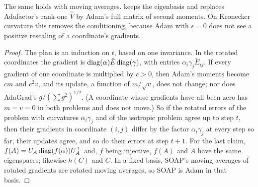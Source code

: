 \begin{refsection}
The same holds with moving averages.  keeps the eigenbasis and replaces Adafactor's rank-one $\hat V$ by Adam's full matrix of second moments. On Kronecker curvature this removes the conditioning, because Adam with $\epsilon=0$ does not see a positive rescaling of a coordinate's gradients.


\begin{proof}
The plan is an induction on $t$, based on one invariance. In the rotated coordinates the gradient is $\operatorname{diag}(\alpha)\tilde E\operatorname{diag}(\gamma)$, with entries $\alpha_i\gamma_j\tilde E_{ij}$. If every gradient of one coordinate is multiplied by $c>0$, then Adam's moments become $cm$ and $c^2v$, and its update, a function of $m/\sqrt v$, does not change; nor does AdaGrad's $g/(\sum g^2)^{1/2}$. (A coordinate whose gradients have all been zero has $m=v=0$ in both problems and does not move.) So if the rotated errors of the problem with curvatures $\alpha_i\gamma_j$ and of the isotropic problem agree up to step $t$, then their gradients in coordinate $(i,j)$ differ by the factor $\alpha_i\gamma_j$ at every step so far, their updates agree, and so do their errors at step $t+1$. For the last claim, $f(A)=U_A\operatorname{diag}(f(\alpha))U_A^\top$ and, $f$ being injective, $f(A)$ and $A$ have the same eigenspaces; likewise $h(C)$ and $C$. In a fixed basis, SOAP's moving averages of rotated gradients are rotated moving averages, so SOAP is Adam in that basis.
\end{proof}


\end{refsection}
